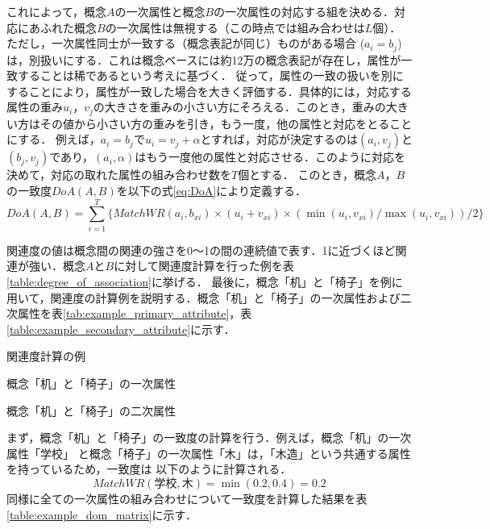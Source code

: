 \documentclass[japanese]{jnlp_1.4}
\begin{document}
これによって，概念$A$の一次属性と概念$B$の一次属性の対応する組を決める．対応にあふれた概念$B$の一次属性は無視する（この時点では組み合わせは$L$個）．
ただし，一次属性同士が一致する（概念表記が同じ）ものがある場合 ($a_i=b_j$) は，別扱いにする．これは概念ベースには約12万の概念表記が存在し，属性が一致することは稀であるという考えに基づく．
従って，属性の一致の扱いを別にすることにより，属性が一致した場合を大きく評価する．具体的には，対応する属性の重み$u_i$，$v_j$の大きさを重みの小さい方にそろえる．このとき，重みの大きい方はその値から小さい方の重みを引き，もう一度，他の属性と対応をとることにする．
例えば，$a_i=b_j$で$u_i=v_j+\alpha$とすれば，対応が決定するのは$(a_i,v_j)$と$(b_j,v_j)$であり，$(a_i,\alpha)$はもう一度他の属性と対応させる．このように対応を決めて，対応の取れた属性の組み合わせ数を$T$個とする．
\pagebreak
このとき，概念$A$，$B$の一致度$DoA(A,B)$を以下の式\ref{eq:DoA}により定義する．
\begin{equation}
 DoA(A,B)=\sum_{i=1}^T\{MatchWR(a_i,b_{xi}) \times (u_i+v_{xi}) \times (\min(u_i,v_{xi})/\max(u_i,v_{xi}))/2\}
	\label{eq:DoA}
\end{equation}

関連度の値は概念間の関連の強さを0〜1の間の連続値で表す．1に近づくほど関連が強い．概念$A$と$B$に対して関連度計算を行った例を表\ref{table:degree_of_association}に挙げる．
最後に，概念「机」と「椅子」を例に用いて，関連度の計算例を説明する．概念「机」と「椅子」の一次属性および二次属性を表\ref{tab:example_primary_attribute}，表\ref{table:example_secondary_attribute}に示す．
\begin{table}[b]
\begin{minipage}{0.45\textwidth}
\caption{関連度計算の例}
\label{table:degree_of_association}

\end{minipage}
\begin{minipage}{0.45\textwidth}
\caption{概念「机」と「椅子」の一次属性}
\label{tab:example_primary_attribute}

\end{minipage}
\end{table}
\begin{table}[b]
\caption{概念「机」と「椅子」の二次属性}
\label{table:example_secondary_attribute}

\end{table}

まず，概念「机」と「椅子」の一致度の計算を行う．例えば，概念「机」の一次属性「学校」
と概念「椅子」の一次属性「木」は，「木造」という共通する属性を持っているため，一致度は
以下のように計算される．
\[
 MatchWR(学校,木)=\min(0.2,0.4)=0.2
\]
同様に全ての一次属性の組み合わせについて一致度を計算した結果を表\ref{table:example_dom_matrix}に示す．
\end{document}
